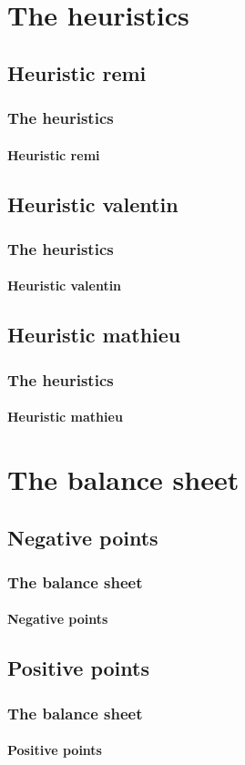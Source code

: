 \documentclass[a4paper, 11pt]{beamer}
\begin{document}
\section{The heuristics}
\subsection{Heuristic remi}
\begin{frame}
\frametitle{The heuristics}
\framesubtitle{Heuristic remi}

\end{frame}

\subsection{Heuristic valentin}
\begin{frame}
\frametitle{The heuristics}
\framesubtitle{Heuristic valentin}

\end{frame}

\subsection{Heuristic mathieu}
\begin{frame}
\frametitle{The heuristics}
\framesubtitle{Heuristic mathieu}

\end{frame}

\section{The balance sheet}
\subsection{Negative points}
\begin{frame}
\frametitle{The balance sheet}
\framesubtitle{Negative points}

\end{frame}

\subsection{Positive points}
\begin{frame}
\frametitle{The balance sheet}
\framesubtitle{Positive points}

\end{frame}
\end{document}
